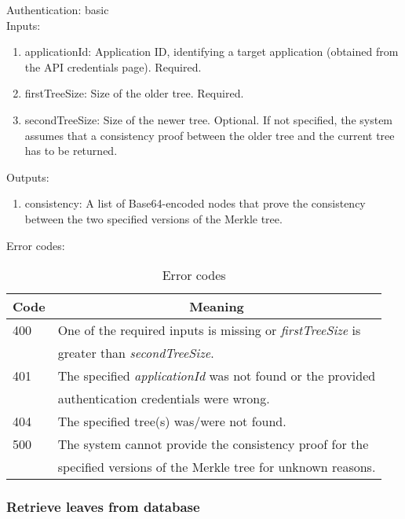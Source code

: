 \documentclass{article}
\begin{document}
		\noindent Authentication: basic \\
		
		\noindent Inputs:
		\begin{enumerate}
			\item applicationId: Application ID, identifying a target application (obtained from the API credentials page). Required.
			\item firstTreeSize: Size of the older tree. Required.
			\item secondTreeSize: Size of the newer tree. Optional. If not specified, the system assumes that a consistency proof between the older tree and the current tree has to be returned. 
		\end{enumerate}
		
		\noindent Outputs:
		\begin{enumerate}
			\item consistency: A list of Base64-encoded nodes that prove the consistency between the two specified versions of the Merkle tree.
		\end{enumerate}
		
		\noindent Error codes:
		\begin{table}[H]
			\centering
			\caption{Error codes}
			\label{merkle-consistency-error-codes}
			\begin{tabular}{|l|l|}
				\hline
				\multicolumn{1}{|c|}{Code} & 	\multicolumn{1}{c|}{Meaning} \\ \hline
				400 & One of the required inputs is missing or \textit{firstTreeSize} is \\
				& greater than \textit{secondTreeSize}. \\ \hline
				401 & The specified \textit{applicationId} was not found or the provided \\
				& authentication credentials were wrong. \\ \hline
				404 & The specified tree(s) was/were not found. \\ \hline
				500 & The system cannot provide the consistency proof for the \\ & specified versions of the Merkle tree for unknown  reasons. \\ \hline
			\end{tabular}
		\end{table}
	
		\subsubsection{Retrieve leaves from database}
		
\end{document}
